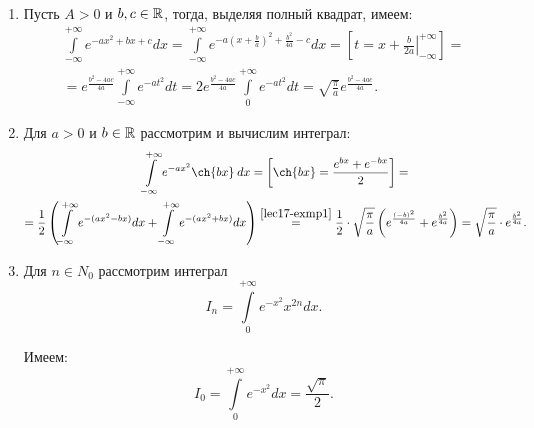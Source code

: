 \documentclass[../../main.tex]{subfiles}
\begin{document}
\begin{examples}
~
 \begin{enumerate}
  \item Пусть  $A>0$ и $b, c \in \mathbb{R}$, тогда, выделяя полный квадрат, имеем:
  \begin{equation}
  \begin{gathered}
   \int\limits_{-\infty}^{+\infty}e^{-ax^2 + bx + c}dx =
   \int\limits_{-\infty}^{+\infty}e^{-a(x + \frac{b}{a})^2 +
   \frac{b^2}{4a} - c}dx =
   \left[t = x + \left.\frac{b}{2a}\right|_{-\infty}^{+\infty} \right] = \\
   = e^{\frac{b^2-4ac}{4a}} \int\limits_{-\infty}^{+\infty}e^{-at^2}dt =
   2e^{\frac{b^2-4ac}{4a}} \int\limits_0^{+\infty}e^{-at^2}dt=
   \sqrt{\frac{\pi}{a}}e^{\frac{b^2-4ac}{4a}}.
  \end{gathered}
  \label{lec17-exmp1}
  \end{equation}

  \item Для $a>0$ и $b \in \mathbb{R}$ рассмотрим и вычислим интеграл:
  \begin{gather*}
    \int\limits_{-\infty}^{+\infty}e^{-ax^2}\ch{bx}\:dx =
    \left[\ch{bx} = \frac{e^{bx} + e^{-bx}}{2} \right] =
	\\
    =\frac{1}{2}\left(\int\limits_{-\infty}^{+\infty}e^{-(ax^2 - bx)}dx  +
    \int\limits_{-\infty}^{+\infty}e^{-(ax^2 + bx)}dx\right)
    \stk{lec17-exmp1}{=} \frac{1}{2}\cdot\sqrt{\frac\pi a}
    \left(e^{\frac{(-b)^2}{4a}} + e^{\frac{b^2}{4a}}\right) =
    \sqrt{\frac{\pi}{a}}\cdot e^{\frac{b^2}{4a}}.
  \end{gather*}
  \item Для $n \in N_0$ рассмотрим интеграл 
  \[I_n = \int\limits_{0}^{+\infty} e^{-x^2}x^{2n}dx.\]
  
  Имеем:
  \[
   I_0 = \int\limits_0^{+\infty}e^{-x^2}dx = \frac{\sqrt{\pi}}{2}.
  \]
  

\end{enumerate}
\end{examples}
\end{document}
